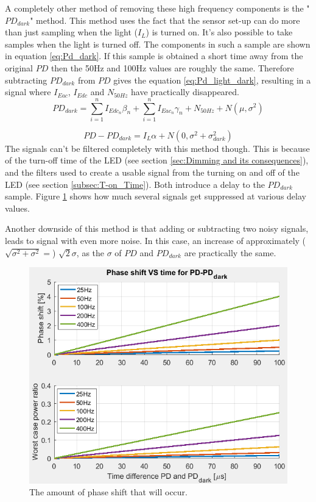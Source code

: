 A completely other method of removing these high frequency components is the "$PD_{dark}$" method. This method uses the fact that the sensor set-up can do more than just sampling when the light ($I_{L}$) is turned on. It's also possible to take samples when the light is turned off. The components in such a sample are shown in equation \ref{eq:Pd_dark}. If this sample is obtained a short time away from the original $PD$ then the 50Hz and 100Hz values are roughly the same. Therefore subtracting $PD_{dark}$ from $PD$ gives the equation \ref{eq:Pd_light_dark}, resulting in a signal where $I_{Eac}$, $I_{Edc}$ and $N_{50Hz}$ have practically disappeared.
\begin{equation}
\label{eq:Pd_dark}
PD_{dark} = \sum_{i=1}^n I_{Edc_{n}} \beta_{n} + \sum_{i=1}^n I_{Eac{_n}} \gamma_{n} + N_{50Hz} + N(\mu,\sigma^2)
\end{equation}

\begin{equation}
\label{eq:Pd_light_dark}
PD - PD_{dark} = I_{L} \alpha + N(0,\sigma^2 + \sigma^2_{dark})
\end{equation}
The signals can't be filtered completely with this method though. This is because of the turn-off time of the LED (see section \ref{sec:Dimming and its consequences}), and the filters used to create a usable signal from the turning on and off of the LED (see section \ref{subsec:T-on_Time}). Both introduce a delay to the $PD_{dark}$ sample. Figure \ref{fig:Phaseshift} shows how much several signals get suppressed at various delay values.

Another downside of this method is that adding or subtracting two noisy signals, leads to signal with even more noise. In this case, an increase of approximately ($\sqrt{\sigma^2+\sigma^2} =$) $\sqrt{2} \sigma$\cite{@needref@}, as the $\sigma$ of $PD$ and $PD_{dark}$ are practically the same.

\begin{figure}
	\includegraphics[width=\textwidth]{pics/PasheshiftVStime.png}
	\caption{The amount of phase shift that will occur.}
	\label{fig:Phaseshift}
\end{figure}

